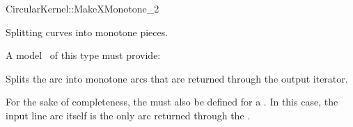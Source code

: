 \begin{ccRefFunctionObjectConcept}{CircularKernel::MakeXMonotone_2}

\ccDefinition

Splitting curves into monotone pieces. 


A model \ccVar\ of this type must provide:

{Splits the arc  into monotone arcs that are returned through the 
output iterator.}

For the sake of completeness, the  must also be defined for a 
. In this case, the input line arc itself is the only
arc returned through the . 

\ccHasModels


\ccSeeAlso


\end{ccRefFunctionObjectConcept}
